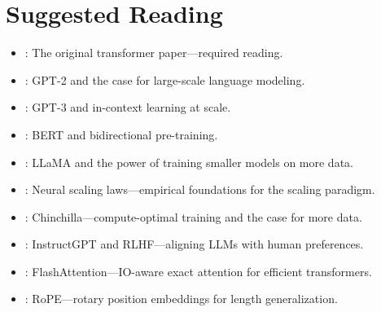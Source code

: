 \section*{Suggested Reading}
\begin{itemize}[leftmargin=1.5em]
  \item \citet{vaswani2017}: The original transformer paper---required reading.
  \item \citet{radford2019}: GPT-2 and the case for large-scale language modeling.
  \item \citet{brown2020}: GPT-3 and in-context learning at scale.
  \item \citet{devlin2019}: BERT and bidirectional pre-training.
  \item \citet{touvron2023}: LLaMA and the power of training smaller models on more data.
  \item \citet{kaplan2020}: Neural scaling laws---empirical foundations for the scaling paradigm.
  \item \citet{hoffmann2022}: Chinchilla---compute-optimal training and the case for more data.
  \item \citet{ouyang2022}: InstructGPT and RLHF---aligning LLMs with human preferences.
  \item \citet{dao2022}: FlashAttention---IO-aware exact attention for efficient transformers.
  \item \citet{su2024}: RoPE---rotary position embeddings for length generalization.
\end{itemize}
